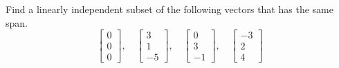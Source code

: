 \begin{exercise}\ansMark%
Find a linearly independent subset of the following vectors that has
the same span.
\begin{equation*}
\begin{bmatrix}
0 \\ 0 \\ 0
\end{bmatrix}
, \quad
\begin{bmatrix}
3 \\ 1 \\ -5
\end{bmatrix}
, \quad
\begin{bmatrix}
0 \\ 3 \\ -1
\end{bmatrix}
, \quad
\begin{bmatrix}
-3 \\ 2 \\ 4
\end{bmatrix}
\end{equation*}
\end{exercise}
\exsol{%
$\left[\begin{smallmatrix}
3 \\ 1 \\ -5
\end{smallmatrix}\right]
, 
\left[\begin{smallmatrix}
0 \\ 3 \\ -1
\end{smallmatrix}\right]$
}

